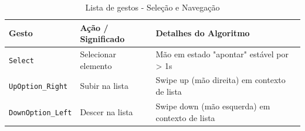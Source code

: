 \documentclass{report}
\begin{document}
\begin{longtable}{p{} p{} p{}}
    \caption{Lista de gestos - Seleção e Navegação} 
    \label{tab:gestos_selecao_navegacao} \\
    
    \toprule
    \textbf{Gesto} & \textbf{Ação / Significado} & \textbf{Detalhes do Algoritmo} \\
    \midrule
    \endfirsthead
    \endlastfoot
    
    \texttt{Select} & Selecionar elemento & Mão em estado "apontar" estável por > 1s \\
    \texttt{UpOption\_Right} & Subir na lista & Swipe up (mão direita) em contexto de lista \\
    \texttt{DownOption\_Left} & Descer na lista & Swipe down (mão esquerda) em contexto de lista \\
\end{longtable}
\end{document}
